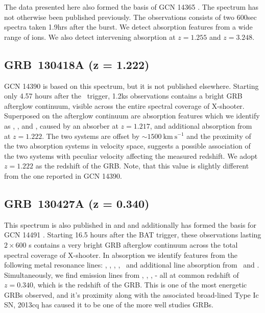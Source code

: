 \documentclass{aa}    %
\begin{document}
The data presented here also formed the basis of GCN 14365 \citep{GCN14365}. The
spectrum has not otherwise been published previously. The observations consists
of two 600sec spectra taken 1.9hrs after the burst. We detect absorption
features from a wide range of ions. We also detect intervening absorption at
$z=1.255$ and $z=3.248$.

\subsection{GRB~130418A (z = 1.222)} \label{130418}

GCN 14390 \citep{GCN14390} is based on this spectrum, but it is not published
elsewhere. Starting only 4.57 hours after the \swift~trigger, 1.2ks observations
contains a bright GRB afterglow continuum, visible across the entire spectral
coverage of X-shooter. Superposed on the afterglow continuum are absorption
features which we identify as \civ, \feii, and \mgii, caused by an absorber at
$z = 1.217$, and additional absorption from \civ~ at $z = 1.222$. The two
systems are offset by $\sim 1500~\mathrm{km}~\mathrm{s}^{-1}$ and the proximity
of the two absorption systems in velocity space, suggests a possible association
of the two systems with peculiar velocity affecting the measured redshift. We
adopt $z = 1.222$ as the redshift of the GRB. Note, that this value is slightly
different from the one reported in GCN  14390.

\subsection{GRB~130427A (z = 0.340)} \label{130427}

This spectrum is also published in \citet{Xu2013b} and \citet{Kruhler2015} and
additionally has formed the basis for GCN 14491 \citep{GCN14491}. Starting 16.5
hours after the BAT trigger, these observations lasting $2 \times 600$ s
contains a very bright GRB afterglow continuum across the total spectral
coverage of X-shooter. In absorption we identify features from the following
metal resonance lines: \feii, \mnii, \mgii, \mgi, \TIii~and additional line
absorption from \caii~and \nai. Simultaneously, we find emission lines from \ha,
\hb, \oiii, \oii - all at common redshift of $z = 0.340$, which is the redshift
of the GRB. This is one of the most energetic GRBs observed, and it's proximity
along with the associated broad-lined Type Ic SN, 2013cq has caused it to be one
of the more well studies GRBs.
\end{document}
